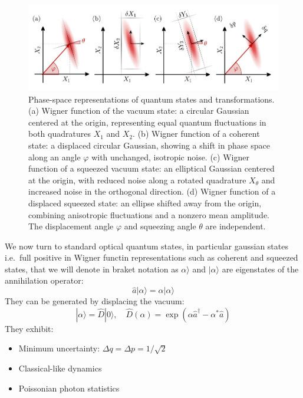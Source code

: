 \begin{figure}
\centering
\includegraphics[width=\textwidth]{./chap2/fig/quadratures_phasespace.pdf}
\caption{Phase-space representations of quantum states and transformations.
(a) Wigner function of the vacuum state: a circular Gaussian centered at the origin, representing equal quantum fluctuations in both quadratures $X_1$ and $X_2$.
(b) Wigner function of a coherent state: a displaced circular Gaussian, showing a shift in phase space along an angle $\varphi$ with unchanged, isotropic noise.
(c) Wigner function of a squeezed vacuum state: an elliptical Gaussian centered at the origin, with reduced noise along a rotated quadrature $X_\theta$ and increased noise in the orthogonal direction.
(d) Wigner function of a displaced squeezed state: an ellipse shifted away from the origin, combining anisotropic fluctuations and a nonzero mean amplitude. The displacement angle $\varphi$ and squeezing angle $\theta$ are independent.} 
\end{figure}


We now turn to standard optical quantum states, in particular gaussian states i.e.\ full positive in Wigner functin representations such as coherent and squeezed states, that we will denote in braket notation as $\alpha\rangle$ and  $|\alpha\rangle$ are eigenstates of the annihilation operator:
\begin{equation}
\hat{a}|\alpha\rangle = \alpha|\alpha\rangle
\end{equation}
They can be generated by displacing the vacuum:
\begin{equation}
|\alpha\rangle = \hat{D}|0\rangle, \quad \hat{D}(\alpha) = \exp(\alpha \hat{a}^\dagger - \alpha^* \hat{a})
\end{equation}
They exhibit:
\begin{itemize}
  \item Minimum uncertainty: $\Delta q = \Delta p = 1/\sqrt{2}$
  \item Classical-like dynamics
  \item Poissonian photon statistics
\end{itemize}

